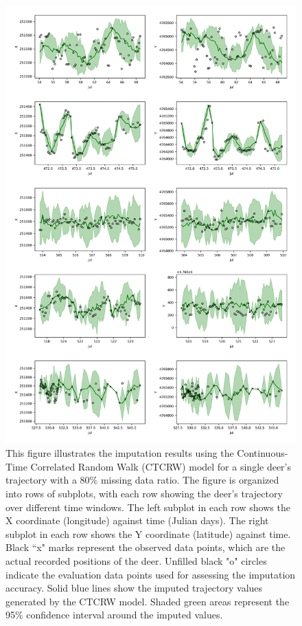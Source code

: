 \documentclass[11pt]{article}
\begin{document}
\begin{figure}[h]
  \centering
  \includegraphics[width=\textwidth]{../figure/80_5094_crawl} %
  \caption{This figure illustrates the imputation results using the Continuous-Time Correlated Random Walk (CTCRW) model for a single deer's trajectory with a 80\% missing data ratio. The figure is organized into rows of subplots, with each row showing the deer's trajectory over different time windows. The left subplot in each row shows the X coordinate (longitude) against time (Julian days). The right subplot in each row shows the Y coordinate (latitude) against time. Black ``x" marks represent the observed data points, which are the actual recorded positions of the deer. Unfilled black "o" circles indicate the evaluation data points used for assessing the imputation accuracy. Solid blue lines show the imputed trajectory values generated by the CTCRW model. Shaded green areas represent the 95\% confidence interval around the imputed values.}
  \label{fig: ctcrw_80} %
\end{figure}
\end{document}
